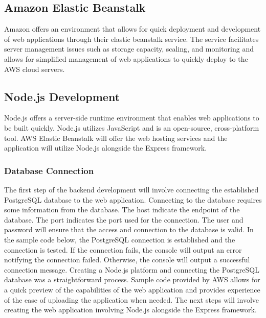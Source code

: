 \documentclass[12pt]{article}
\begin{document}
\subsection{Amazon Elastic Beanstalk}

Amazon offers an environment that allows for quick deployment and development of web applications through their elastic beanstalk service.  The service facilitates server management issues such as storage capacity, scaling, and monitoring and allows for simplified management of web applications to quickly deploy to the AWS cloud servers.

\subsection{Node.js Development}

Node.js offers a server-side runtime environment that enables web applications to be built quickly.  Node.js utilizes JavaScript and is an open-source, cross-platform tool.  AWS Elastic Beanstalk will offer the web hosting services and the application will utilize Node.js alongside the Express framework.

\subsubsection{Database Connection}

The first step of the backend development will involve connecting the established PostgreSQL database to the web application.  Connecting to the database requires some information from the database.  The host indicate the endpoint of the database.  The port indicates the port used for the connection.  The user and password will ensure that the access and connection to the database is valid.  In the sample code below, the PostgreSQL connection is established and the connection is tested.  If the connection fails, the console will output an error notifying the connection failed. Otherwise, the console will output a successful connection message.
Creating a Node.js platform and connecting the PostgreSQL database was a straightforward process.  Sample code provided by AWS allows for a quick preview of the capabilities of the web application and provides experience of the ease of uploading the application when needed.
The next steps will involve creating the web application involving Node.js alongside the Express framework.
\end{document}
